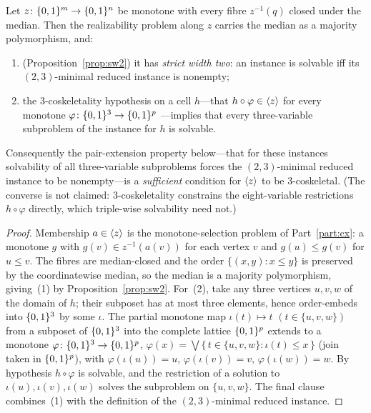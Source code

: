 \begin{prop}\label{prop:medred}
  Let $z\colon\{0,1\}^m\to\{0,1\}^n$ be monotone with every fibre $z^{-1}(q)$ closed
  under the median.  Then the realizability problem along $z$ carries the
  median as a majority polymorphism, and:
  \begin{enumerate}
  \item (Proposition~\ref{prop:sw2}) it has \emph{strict width two}: an
    instance is solvable iff its $(2,3)$-minimal reduced instance is
    nonempty;
  \item the $3$-coskeletality hypothesis on a cell $h$---that
    $h\circ\varphi\in\langle z \rangle$ for every monotone $\varphi\colon\{0,1\}^3\to\{0,1\}^p$
    ---implies that every three-variable subproblem of the instance for
    $h$ is solvable.
  \end{enumerate}
  Consequently the pair-extension property below---that for these
  instances solvability of all three-variable subproblems forces the
  $(2,3)$-minimal reduced instance to be nonempty---is a \emph{sufficient}
  condition for $\langle z \rangle$ to be $3$-coskeletal.  \textup{(}The converse is
  not claimed:
  $3$-coskeletality constrains the eight-variable restrictions
  $h\circ\varphi$ directly, which triple-wise solvability need not.\textup{)}
\end{prop}
\begin{proof}
  Membership $a\in\langle z \rangle$ is the monotone-selection problem of
  Part~\ref{part:cx}: a monotone $g$ with $g(v)\in z^{-1}(a(v))$ for each
  vertex $v$ and $g(u)\le g(v)$ for $u\le v$.  The fibres are median-closed
  and the order $\{(x,y):x\le y\}$ is preserved by the coordinatewise
  median, so the median is a majority polymorphism, giving~(1) by
  Proposition~\ref{prop:sw2}.  For~(2), take any three vertices $u,v,w$ of
  the domain of $h$; their subposet has at most three elements, hence
  order-embeds into $\{0,1\}^3$ by some $\iota$.  The partial monotone map
  $\iota(t)\mapsto t$ $(t\in\{u,v,w\})$ from a subposet of $\{0,1\}^3$ into the
  complete lattice $\{0,1\}^p$ extends to a monotone
  $\varphi\colon\{0,1\}^3\to\{0,1\}^p$, $\varphi(x)=\bigvee\{\,t\in\{u,v,w\}:
  \iota(t)\le x\,\}$ \textup{(}join taken in $\{0,1\}^p$\textup{)}, with
  $\varphi(\iota(u))=u$, $\varphi(\iota(v))=v$, $\varphi(\iota(w))=w$.  By
  hypothesis $h\circ\varphi$ is solvable, and the restriction of a
  solution to $\iota(u),\iota(v),\iota(w)$ solves the subproblem on
  $\{u,v,w\}$.  The final clause combines~(1) with the definition of the
  $(2,3)$-minimal reduced instance.
\end{proof}

